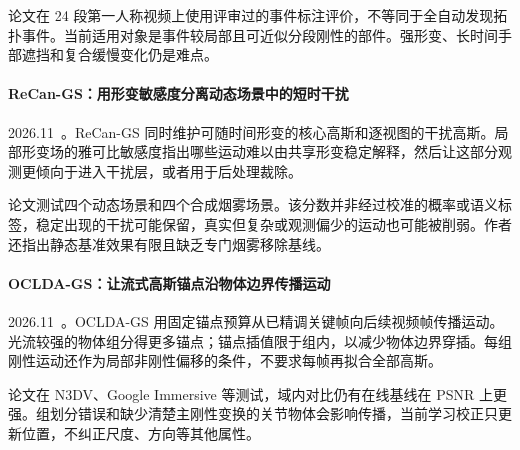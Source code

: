 论文在 24 段第一人称视频上使用评审过的事件标注评价，不等同于全自动发现拓扑事件。当前适用对象是事件较局部且可近似分段刚性的部件。强形变、长时间手部遮挡和复合缓慢变化仍是难点。

\paragraph{ReCan-GS：用形变敏感度分离动态场景中的短时干扰}
2026.11~\cite{2611_16259}。ReCan-GS 同时维护可随时间形变的核心高斯和逐视图的干扰高斯。局部形变场的雅可比敏感度指出哪些运动难以由共享形变稳定解释，然后让这部分观测更倾向于进入干扰层，或者用于后处理裁除。

论文测试四个动态场景和四个合成烟雾场景。该分数并非经过校准的概率或语义标签，稳定出现的干扰可能保留，真实但复杂或观测偏少的运动也可能被削弱。作者还指出静态基准效果有限且缺乏专门烟雾移除基线。

\paragraph{OCLDA-GS：让流式高斯锚点沿物体边界传播运动}
2026.11~\cite{2611_23416}。OCLDA-GS 用固定锚点预算从已精调关键帧向后续视频帧传播运动。光流较强的物体组分得更多锚点；锚点插值限于组内，以减少物体边界穿插。每组刚性运动还作为局部非刚性偏移的条件，不要求每帧再拟合全部高斯。

论文在 N3DV、Google Immersive 等测试，域内对比仍有在线基线在 PSNR 上更强。组划分错误和缺少清楚主刚性变换的关节物体会影响传播，当前学习校正只更新位置，不纠正尺度、方向等其他属性。
